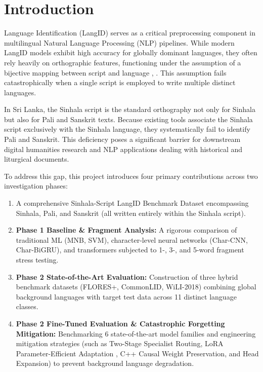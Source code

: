 \documentclass[conference]{IEEEtran}
\begin{document}
\section{Introduction}
Language Identification (LangID) serves as a critical preprocessing component in multilingual Natural Language Processing (NLP) pipelines. While modern LangID models exhibit high accuracy for globally dominant languages, they often rely heavily on orthographic features, functioning under the assumption of a bijective mapping between script and language \cite{b1}, \cite{b4}. This assumption fails catastrophically when a single script is employed to write multiple distinct languages.

In Sri Lanka, the Sinhala script is the standard orthography not only for Sinhala but also for Pali and Sanskrit texts. Because existing tools associate the Sinhala script exclusively with the Sinhala language, they systematically fail to identify Pali and Sanskrit. This deficiency poses a significant barrier for downstream digital humanities research and NLP applications dealing with historical and liturgical documents.

To address this gap, this project introduces four primary contributions across two investigation phases:
\begin{enumerate}
    \item A comprehensive Sinhala-Script LangID Benchmark Dataset encompassing Sinhala, Pali, and Sanskrit (all written entirely within the Sinhala script).
    \item \textbf{Phase 1 Baseline \& Fragment Analysis:} A rigorous comparison of traditional ML (MNB, SVM), character-level neural networks (Char-CNN, Char-BiGRU), and transformers subjected to 1-, 3-, and 5-word fragment stress testing.
    \item \textbf{Phase 2 State-of-the-Art Evaluation:} Construction of three hybrid benchmark datasets (FLORES+, CommonLID, WiLI-2018) combining global background languages with target test data across 11 distinct language classes.
    \item \textbf{Phase 2 Fine-Tuned Evaluation \& Catastrophic Forgetting Mitigation:} Benchmarking 6 state-of-the-art model families and engineering mitigation strategies (such as Two-Stage Specialist Routing, LoRA Parameter-Efficient Adaptation \cite{b16}, C++ Causal Weight Preservation, and Head Expansion) to prevent background language degradation.
\end{enumerate}
\end{document}
